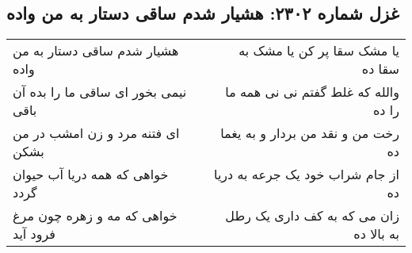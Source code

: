\begin{center}
\section*{غزل شماره ۲۳۰۲: هشیار شدم ساقی دستار به من واده}
\label{sec:2302}
\begin{longtable}{l p{0.5cm} r}
هشیار شدم ساقی دستار به من واده
&&
یا مشک سقا پر کن یا مشک به سقا ده
\\
نیمی بخور ای ساقی ما را بده آن باقی
&&
والله که غلط گفتم نی نی همه ما را ده
\\
ای فتنه مرد و زن امشب در من بشکن
&&
رخت من و نقد من بردار و به یغما ده
\\
خواهی که همه دریا آب حیوان گردد
&&
از جام شراب خود یک جرعه به دریا ده
\\
خواهی که مه و زهره چون مرغ فرود آید
&&
زان می که به کف داری یک رطل به بالا ده
\\
\end{longtable}
\end{center}
